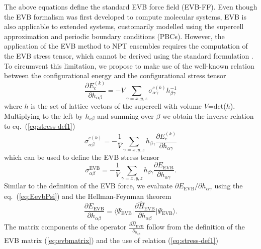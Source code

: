 The above equations define the standard EVB force field (EVB-FF). Even though the EVB formalism was first developed to compute molecular systems, EVB is also applicable to extended systems, customarily modelled using the supercell approximation and periodic boundary conditions (PBCs). However, the application of the EVB method to NPT ensembles requires the computation of the EVB stress tensor, which cannot be derived using the standard formulation \cite{scivetti-evb}. To circumvent this limitation, we propose to make use of the well-known relation between the configurational energy and the configurational stress tensor \cite{essmann-95a}
\begin{equation}\label{eq:stress-def1}
\frac{\partial E^{(k)}_{c}}{\partial h_{\alpha\beta}}=-V\sum_{\gamma=x,y,z}\sigma_{\alpha\gamma}^{c(k)}h^{-1}_{\beta\gamma}
\end{equation}
where $h$ is the set of lattice vectors of the supercell with volume $V$=det($h$). Multiplying to the left by $h_{\nu\beta}$ and summing over $\beta$ we obtain the inverse relation to eq.~(\ref{eq:stress-def1})
\begin{equation}\label{eq:stress-def2}
\sigma_{\alpha\beta}^{c(k)}=-\frac{1}{V}\sum_{\gamma=x,y,z}h_{\beta\gamma}\frac{\partial E^{(k)}_{c}}{\partial h_{\alpha\gamma}}
\end{equation}
which can be used to define the EVB stress tensor
\begin{equation}\label{eq:stress-def3}
\sigma_{\alpha\beta}^{\text{EVB}}=-\frac{1}{V}\sum_{\gamma=x,y,z}h_{\beta\gamma}\frac{\partial E_{\text{EVB}}}{\partial h_{\alpha\gamma}}.
\end{equation}
Similar to the definition of the EVB force, we evaluate $\partial E_{\text{EVB}}/\partial h_{\alpha\gamma}$ using the eq.~(\ref{eq:EevbPsi}) and the Hellman-Feynman theorem 
\begin{equation}\label{eq:stress-EVB}
\frac{\partial E_{\text{EVB}}}{\partial h_{\alpha\beta}}=\big\langle \Psi_{\text{EVB}}\big| \frac{\partial \hat{H}_{\text{EVB}}}{\partial h_{\alpha\beta}}\big| \Psi_{\text{EVB}}\big \rangle.
\end{equation}
The matrix components of the operator $\frac{\partial \hat{H}_{\text{EVB}}}{\partial_{h_{\alpha\beta}}}$ follow from the definition of the EVB matrix (\ref{eq:evbmatrix}) and the use of relation (\ref{eq:stress-def1})
